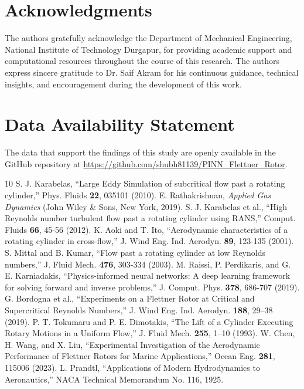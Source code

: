 \documentclass[aip,pof,reprint,onecolumn,amsmath,amssymb,graphicx,longbibliography]{revtex4-2}
\begin{document}
\section*{Acknowledgments}
The authors gratefully acknowledge the Department of Mechanical Engineering, National Institute of Technology Durgapur, for providing academic support and computational resources throughout the course of this research. The authors express sincere gratitude to Dr. Saif Akram for his continuous guidance, technical insights, and encouragement during the development of this work.

\section*{Data Availability Statement}
The data that support the findings of this study are openly available in the GitHub repository at \url{https://github.com/shubh81139/PINN_Flettner_Rotor}.

\begin{thebibliography}{10}
 S. J. Karabelas, ``Large Eddy Simulation of subcritical flow past a rotating cylinder,'' Phys. Fluids \textbf{22}, 035101 (2010).
 E. Rathakrishnan, \textit{Applied Gas Dynamics} (John Wiley \& Sons, New York, 2019).
 S. J. Karabelas et al., ``High Reynolds number turbulent flow past a rotating cylinder using RANS,'' Comput. Fluids \textbf{66}, 45-56 (2012).
 K. Aoki and T. Ito, ``Aerodynamic characteristics of a rotating cylinder in cross-flow,'' J. Wind Eng. Ind. Aerodyn. \textbf{89}, 123-135 (2001).
 S. Mittal and B. Kumar, ``Flow past a rotating cylinder at low Reynolds numbers,'' J. Fluid Mech. \textbf{476}, 303-334 (2003).
 M. Raissi, P. Perdikaris, and G. E. Karniadakis, ``Physics-informed neural networks: A deep learning framework for solving forward and inverse problems,'' J. Comput. Phys. \textbf{378}, 686-707 (2019).
 G. Bordogna et al., ``Experiments on a Flettner Rotor at Critical and Supercritical Reynolds Numbers,'' J. Wind Eng. Ind. Aerodyn. \textbf{188}, 29–38 (2019).
 P. T. Tokumaru and P. E. Dimotakis, ``The Lift of a Cylinder Executing Rotary Motions in a Uniform Flow,'' J. Fluid Mech. \textbf{255}, 1–10 (1993).
 W. Chen, H. Wang, and X. Liu, ``Experimental Investigation of the Aerodynamic Performance of Flettner Rotors for Marine Applications,'' Ocean Eng. \textbf{281}, 115006 (2023).
 L. Prandtl, ``Applications of Modern Hydrodynamics to Aeronautics,'' NACA Technical Memorandum No. 116, 1925.
\end{thebibliography}
\end{document}

